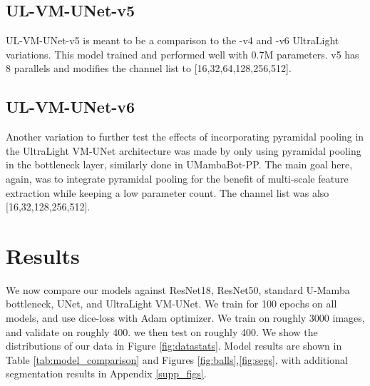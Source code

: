 \documentclass[conference]{IEEEtran}
\begin{document}
\subsection{UL-VM-UNet-v5}
UL-VM-UNet-v5 is meant to be a comparison to the -v4 and -v6 UltraLight variations. This model trained and performed well with 0.7M parameters. v5 has 8 parallels and modifies the channel list to [16,32,64,128,256,512].

\subsection{UL-VM-UNet-v6}
Another variation to further test the effects of incorporating pyramidal pooling in the UltraLight VM-UNet architecture was made by only using pyramidal pooling in the bottleneck layer, similarly done in UMambaBot-PP. The main goal here, again, was to integrate pyramidal pooling for the benefit of multi-scale feature extraction while keeping a low parameter count. The channel list was also [16,32,128,256,512].

\section{Results}
We now compare our models against ResNet18, ResNet50, standard U-Mamba bottleneck, UNet, and UltraLight VM-UNet. We train for 100 epochs on all models, and use dice-loss with Adam optimizer. We train on roughly 3000 images, and validate on roughly 400. we then test on roughly 400. We show the distributions of our data in Figure \ref{fig:datastats}.
Model results are shown in Table \ref{tab:model_comparison} and Figures \ref{fig:balls},\ref{fig:segs}, with additional segmentation results in Appendix \ref{supp_figs}.
\end{document}
